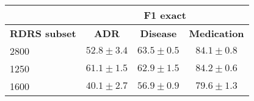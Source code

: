\setlength\tabcolsep{2.2pt}
\begin{tabular}{|l|c|c|c|}
\hline
                     & \multicolumn{3}{c|}{\textbf{F1 exact}}                                                            \\
\hline
\textbf{RDRS subset} & \textbf{ADR}                                            & \textbf{Disease} & \textbf{Medication}  \\
\hline
2800                 & $52.8\pm3.4$ & $63.5\pm0.5$    & $84.1\pm0.8$        \\
\hline
1250                 & $61.1\pm1.5$  & $62.9\pm1.5$   & $84.2\pm0.6$                 \\
\hline
1600                 & $40.1\pm2.7$ & $56.9\pm0.9$    & $79.6\pm1.3$        \\
\hline
\end{tabular}